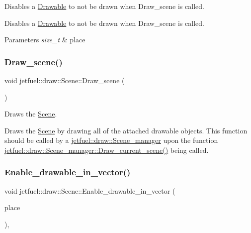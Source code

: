 Disables a \hyperlink{classjetfuel_1_1draw_1_1Drawable}{Drawable} to not be drawn when Draw\+\_\+scene is called. 

Disables a \hyperlink{classjetfuel_1_1draw_1_1Drawable}{Drawable} to not be drawn when Draw\+\_\+scene is called.


\begin{DoxyParams}{Parameters}
{\em size\+\_\+t} & place \\
\hline
\end{DoxyParams}
\mbox{\label{classjetfuel_1_1draw_1_1Scene_a80b9b5f38022b6c2af9921656f93056b}} 
\subsubsection{\texorpdfstring{Draw\+\_\+scene()}{Draw\_scene()}}
{\footnotesize\ttfamily void jetfuel\+::draw\+::\+Scene\+::\+Draw\+\_\+scene (\begin{DoxyParamCaption}{ }\end{DoxyParamCaption})}



Draws the \hyperlink{classjetfuel_1_1draw_1_1Scene}{Scene}. 

Draws the \hyperlink{classjetfuel_1_1draw_1_1Scene}{Scene} by drawing all of the attached drawable objects. This function should be called by a \hyperlink{classjetfuel_1_1draw_1_1Scene__manager}{jetfuel\+::draw\+::\+Scene\+\_\+manager} upon the function \hyperlink{classjetfuel_1_1draw_1_1Scene__manager_a8af9a3abfd5121b1b8556342de435773}{jetfuel\+::draw\+::\+Scene\+\_\+manager\+::\+Draw\+\_\+current\+\_\+scene()} being called. \mbox{\label{classjetfuel_1_1draw_1_1Scene_a517687bb7b400a9e0b82c4c53e1939cc}} 
\subsubsection{\texorpdfstring{Enable\+\_\+drawable\+\_\+in\+\_\+vector()}{Enable\_drawable\_in\_vector()}}
{\footnotesize\ttfamily void jetfuel\+::draw\+::\+Scene\+::\+Enable\+\_\+drawable\+\_\+in\+\_\+vector (\begin{DoxyParamCaption}\item[{size\+\_\+t}]{place }\end{DoxyParamCaption})\hspace{0.3cm}{\ttfamily [inline]}, {\ttfamily [protected]}}




